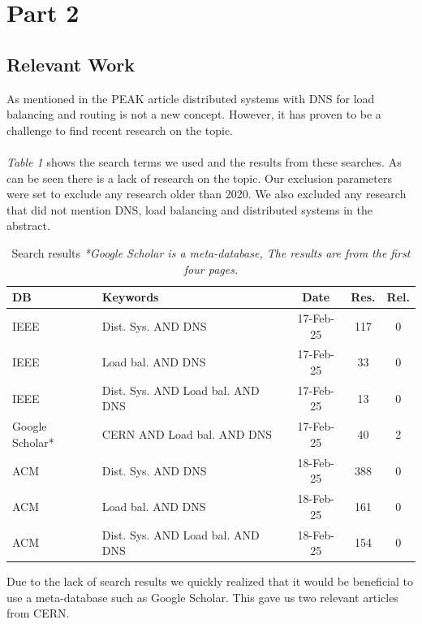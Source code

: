 \documentclass[12pt]{article}
\begin{document}
\section{Part 2}
\subsection{Relevant Work}
As mentioned in the PEAK article \cite{heimonenPreprintPEAKProxy} distributed systems with DNS for load balancing and routing is not a new concept.
However, it has proven to be a challenge to find recent research on the topic.
\\
\\
\textit{Table 1} shows the search terms we used and the results from these searches. As can be seen
there is a lack of research on the topic. Our exclusion parameters were set to exclude any research older than 2020.
We also excluded any research that did not mention DNS, load balancing and distributed systems in the abstract.

\begin{table}[H]
    \centering
    \begin{tabularx}{\textwidth}{|l|X|c|c|c|}
        \hline
        \textbf{DB} & \textbf{Keywords} & \textbf{Date} & \textbf{Res.} & \textbf{Rel.} \\
        \hline
        IEEE & Dist. Sys. AND DNS & 17-Feb-25 & 117 & 0 \\
        \hline
        IEEE & Load bal. AND DNS & 17-Feb-25 & 33 & 0 \\
        \hline
        IEEE & Dist. Sys. AND Load bal. AND DNS & 17-Feb-25 & 13 & 0 \\
        \hline
        Google Scholar* & CERN AND Load bal. AND DNS & 17-Feb-25 & 40 & 2 \\
        \hline
        ACM & Dist. Sys. AND DNS & 18-Feb-25 & 388 & 0 \\
        \hline
        ACM & Load bal. AND DNS & 18-Feb-25 & 161 & 0 \\
        \hline
        ACM & Dist. Sys. AND Load bal. AND DNS & 18-Feb-25 & 154 & 0 \\
        \hline
    \end{tabularx}
    \caption{Search results \textit{*Google Scholar is a meta-database, The results are from the first four pages.}}
\end{table}

Due to the lack of search results we quickly realized that it would be beneficial to use a meta-database such as Google Scholar.
This gave us two relevant articles from CERN.
\end{document}

